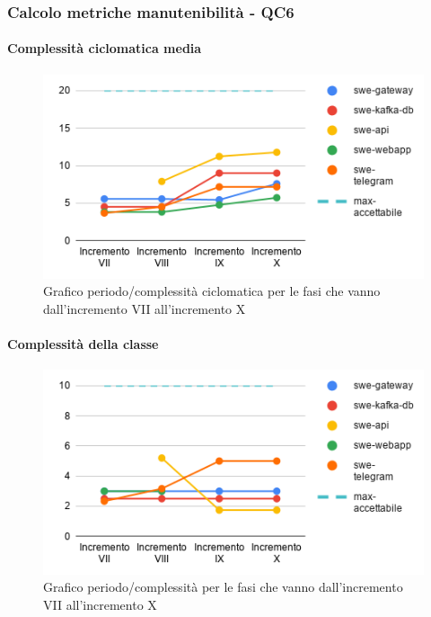\subsubsection{Calcolo metriche manutenibilità - QC6}
\paragraph{Complessità ciclomatica media}
\begin{figure}[H]
			\centering
			\includegraphics[width=0.8\linewidth]{./res/images/QM-PROD-11-COCIM.png}
			\caption{Grafico periodo/complessità ciclomatica per le fasi che vanno dall'incremento VII all'incremento X}
			\label{fig:Grafico periodo/complessità ciclomatica per le fasi che vanno dall'incremento VII all'incremento X}
	\end{figure}
\paragraph{Complessità della classe}
\begin{figure}[H]
			\centering
			\includegraphics[width=0.8\linewidth]{./res/images/QM-PROD-12-CCLA.png}
			\caption{Grafico periodo/complessità per le fasi che vanno dall'incremento VII all'incremento X}
			\label{fig:Grafico periodo/complessità per le fasi che vanno dall'incremento VII all'incremento X}
	\end{figure}
